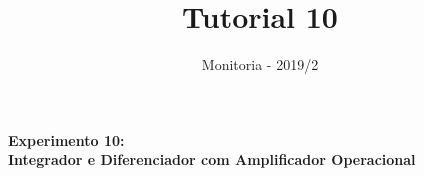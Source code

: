 \documentclass[10pt]{article}
\author{Monitoria - 2019/2}
\title{Tutorial 10}
\numberwithin{table}{section}
\begin{document}
\begin{center}
\vspace*{.03cm}
\Large\bfseries{Experimento 10:}\\ %
\Large{Integrador e Diferenciador com Amplificador Operacional}
\end{center}
\justify




\end{document}
